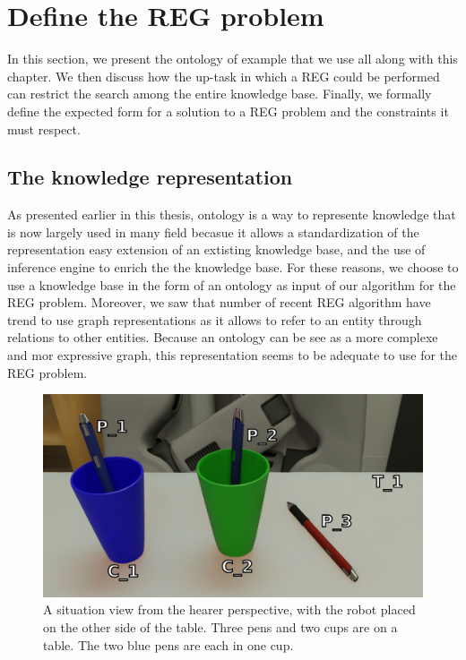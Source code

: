 \section{Define the REG problem}

In this section, we present the ontology of example that we use all along with this chapter. We then discuss how the up-task in which a REG could be performed can restrict the search among the entire knowledge base. Finally, we formally define the expected form for a solution to a REG problem and the constraints it must respect.


\subsection{The knowledge representation}
\label{sec:chap4_kb}

As presented earlier in this thesis, ontology is a way to represente knowledge that is now largely used in many field becasue it allows a standardization of the representation easy extension of an extisting knowledge base, and the use of inference engine to enrich the the knowledge base. For these reasons, we choose to use a knowledge base in the form of an ontology as input of our algorithm for the REG problem. Moreover, we saw that number of recent REG algorithm have trend to use graph representations as it allows to refer to an entity through relations to other entities. Because an ontology can be see as a more complexe and mor expressive graph, this representation seems to be adequate to use for the REG problem. 

\begin{figure}[h!]
\centering
\includegraphics[scale=0.2]{figures/chapter4/pens.png}
\caption{\label{fig:chap4_kb} A situation view from the hearer perspective, with the robot placed on the other side of the table. Three pens and two cups are on a table. The two blue pens are each in one cup. }
\end{figure}

